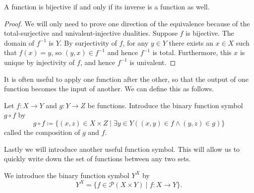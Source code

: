 \documentclass[../main.tex]{subfiles}
\begin{document}
\begin{proposition}
    A function is bijective if and only if its inverse is a function as well.
\end{proposition}
\begin{proof}
    We will only need to prove one direction of the equivalence because of the total-surjective and univalent-injective dualities. Suppose $f$ is bijective. The domain of $f^{-1}$ is $Y$. By surjectivity of $f$, for any $y\in Y$ there exists an $x\in X$ such that $f(x)=y$, so $(y,x)\in f^{-1}$ and hence $f^{-1}$ is total. Furthermore, this $x$ is unique by injectivity of $f$, and hence $f^{-1}$ is univalent.
\end{proof}

It is often useful to apply one function after the other, so that the output of one function becomes the input of another. We can define this as follows.
\begin{definition}
    Let $f:X\to Y$ and $g:Y\to Z$ be functions. Introduce the binary function symbol $g\circ f$ by
    \begin{equation*}
        g\circ f\coloneq\{(x,z)\in X\times Z\mid\exists y\in Y((x,y)\in f\land(y,z)\in g)\}
    \end{equation*}
    called the composition of $g$ and $f$.
\end{definition}

Lastly we will introduce another useful function symbol. This will allow us to quickly write down the set of functions between any two sets.
\begin{definition}
    We introduce the binary function symbol $Y^X$ by
    \begin{equation*}
        Y^X=\{f\in\mathcal{P}(X\times Y)\mid f:X\to Y\}.
    \end{equation*}
\end{definition}
\end{document}
